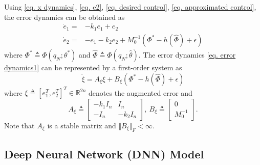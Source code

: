 \documentclass[lettersize,journal]{IEEEtran}
\begin{document}
Using \eqref{eq. x dynamics}, \eqref{eq. e2}, \eqref{eq. desired control}, \eqref{eq. approximated control}, the error dynamics can be obtained as
\begin{equation}
    \begin{aligned}
        \dot e_1 = & -k_1 e_1 + e_2 \\
        \dot e_2 = & -e_1 -k_2 e_2 + M_0^{-1} (\Phi^*-h(\hat\Phi)+\epsilon) 
    \end{aligned}
    \label{eq. error dynamics1}
\end{equation}
where $\Phi^*\triangleq \Phi(q_N;\theta^*)$ and $\hat\Phi\triangleq \Phi(q_N;\hat\theta)$.
The error dynamics \eqref{eq. error dynamics1} can be represented by a first-order system as 
\begin{equation}
    \dot\xi = A_\xi \xi + B_\xi (\Phi^*-h(\hat\Phi)+\epsilon)
    \label{eq. xi dynamics}
\end{equation}
where 
$\xi\triangleq[e_1^T  , e_2^T  ]^T  \in\mathbb{R}^{2n}$ denotes the augmented error
and
\begin{equation*}
    A_\xi \triangleq 
    \begin{bmatrix}
        -k_1 I_n &I_n\\-I_n& -k_2 I_n
    \end{bmatrix}
    ,\ 
    B_\xi \triangleq 
    \begin{bmatrix}
        0\\M_0^{-1}
    \end{bmatrix}.
\end{equation*}
Note that $A_\xi$ is a stable matrix and $\Vert B_\xi\Vert_F<\infty$.

\subsection{Deep Neural Network (DNN) Model}\label{NN definition}
\end{document}

